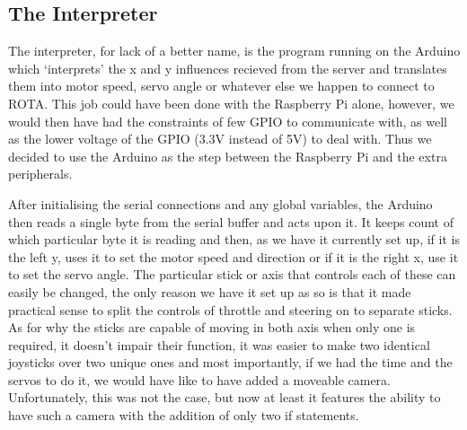 \subsection{The Interpreter}
\par The interpreter, for lack of a better name, is the program running on the Arduino
which `interprets' the x and y influences recieved from the server and translates them
into motor speed, servo angle or whatever else we happen to connect to ROTA.
This job could have been done with the Raspberry Pi alone, however, we would then have
had the constraints of few GPIO to communicate with, as well as the lower voltage of
the GPIO (3.3V instead of 5V) to deal with. Thus we decided to use the Arduino as the
step between the Raspberry Pi and the extra peripherals.
\par After initialising the serial connections and any global variables, the Arduino then
reads a single byte from the serial buffer and acts upon it. It keeps count of which particular
byte it is reading and then, as we have it currently set up, if it is the left y, uses
it to set the motor speed and direction or if it is the right x, use it to set the
servo angle. The particular stick or axis that controls each of these can easily be changed,
the only reason we have it set up as so is that it made practical sense to split
the controls of throttle and steering on to separate sticks. As for why the sticks
are capable of moving in both axis when only one is required, it doesn't impair their
function, it was easier to make two identical joysticks over two unique ones and
most importantly, if we had the time and the servos to do it, we would have like to
have added a moveable camera. Unfortunately, this was not the case, but now at least
it features the ability to have such a camera with the addition of only two if statements.
